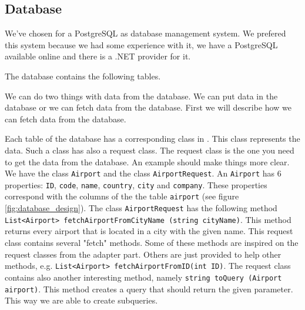
\subsection{Database}
We've chosen for a PostgreSQL as database management system. We prefered this system because we had some experience with it, we have a PostgreSQL available online and there is a .NET provider for it.

The database contains the following tables.

We can do two things with data from the database. We can put data in the database or we can fetch data from the database. First we will describe how we can fetch data from the database.

Each table of the database has a corresponding class in \Csh. This class represents the  data. Such a class has also a request class. The request class is the one you need to get the data from the database. An example should make things more clear. We have the class \texttt{Airport} and the class \texttt{AirportRequest}. An \texttt{Airport} has 6 properties: \texttt{ID}, \texttt{code}, \texttt{name}, \texttt{country}, \texttt{city} and  \texttt{company}. These properties correspond with the columns of the the table \texttt{airport} (see figure \ref{fig:database_design}). The class \texttt{AirportRequest} has the following method \texttt{List<Airport> fetchAirportFromCityName (string cityName)}. This method returns every airport that is located in a city with the given name. This request class contains several "fetch" methods. Some of these methods are inspired on the request classes from the adapter part. Others are just provided to help other methods, e.g. \texttt{List<Airport> fetchAirportFromID(int ID)}. The request class contains also another interesting method, namely \texttt{string toQuery (Airport airport)}. This method creates a query that should return the given parameter. This way we are able to create subqueries.

